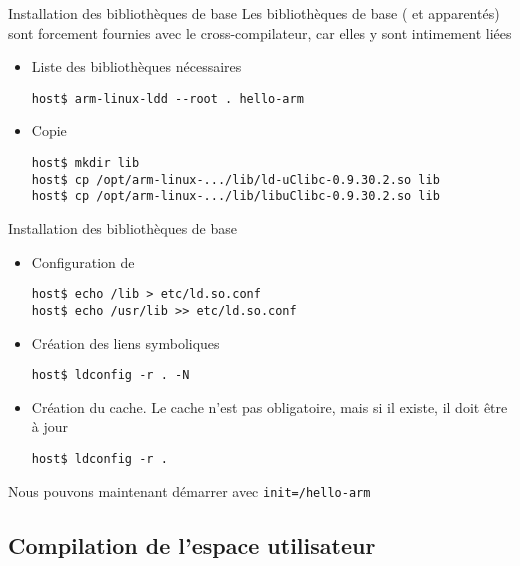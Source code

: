 \begin{frame}[fragile=singleslide]{Installation des bibliothèques de base}
  Les bibliothèques de base  ( et apparentés) sont forcement
  fournies avec le cross-compilateur, car elles y sont intimement liées
  \begin{itemize}
  \item Liste des bibliothèques nécessaires
    \begin{lstlisting}
host$ arm-linux-ldd --root . hello-arm
    \end{lstlisting}
    \item Copie
    \begin{lstlisting}
host$ mkdir lib
host$ cp /opt/arm-linux-.../lib/ld-uClibc-0.9.30.2.so lib
host$ cp /opt/arm-linux-.../lib/libuClibc-0.9.30.2.so lib
    \end{lstlisting}
  \end{itemize}
\end{frame}  

\begin{frame}[fragile=singleslide]{Installation des bibliothèques de base}
  \begin{itemize}
  \item Configuration de 
    \begin{lstlisting}
host$ echo /lib > etc/ld.so.conf
host$ echo /usr/lib >> etc/ld.so.conf
    \end{lstlisting}
  \item Création des liens symboliques
    \begin{lstlisting}
host$ ldconfig -r . -N
    \end{lstlisting}
  \item Création du cache. Le  cache n'est pas obligatoire, mais si il
    existe, il doit être à jour
    \begin{lstlisting}
host$ ldconfig -r .
    \end{lstlisting}
  \end{itemize}
  Nous pouvons maintenant démarrer avec \verb+init=/hello-arm+
\end{frame}

\subsection{Compilation de l'espace utilisateur}

